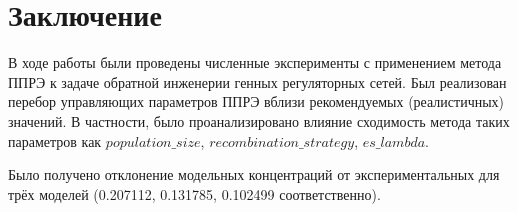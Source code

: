 \chapter*{Заключение}						%

В ходе работы были проведены численные эксперименты с применением метода ППРЭ 
к задаче обратной инженерии генных регуляторных сетей. Был реализован перебор 
управляющих параметров ППРЭ вблизи рекомендуемых (реалистичных) значений.
В частности, было проанализировано влияние сходимость метода таких параметров 
как $population\_size$, $recombination\_strategy$, $es\_lambda$.

Было получено отклонение модельных концентраций от экспериментальных для 
трёх моделей (0.207112, 0.131785, 0.102499 соответственно).

\clearpage
